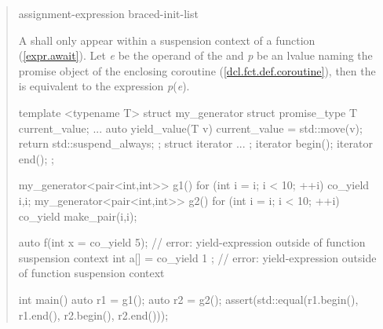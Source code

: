 \begin{quote}
\begin{bnf}
  \br
   assignment-expression\br
   braced-init-list
\end{bnf}

\pnum
A  shall only appear within a suspension context of a function (\ref{expr.await}).
  Let \textit{e} be the operand of the  and \textit{p} be an lvalue naming the promise object of the enclosing coroutine (\ref{dcl.fct.def.coroutine}), then the  is equivalent to the expression  \textit{p}(\textit{e}). 
  

\enterexample
\begin{codeblock}
template <typename T>
struct my_generator {
  struct promise_type {
    T current_value;
    ...
    auto yield_value(T v) {
      current_value = std::move(v);
      return std::suspend_always{};
    }
  };
  struct iterator { ... };
  iterator begin();
  iterator end();
};
  
my_generator<pair<int,int>> g1() {
  for (int i = i; i < 10; ++i) co_yield {i,i};
}
my_generator<pair<int,int>> g2() { 
  for (int i = i; i < 10; ++i) co_yield make_pair(i,i);
}

auto f(int x = co_yield 5); // error: yield-expression outside of function suspension context
int a[] = { co_yield 1 }; // error: yield-expression outside of function suspension context

int main() {
  auto r1 = g1();
  auto r2 = g2();
  assert(std::equal(r1.begin(), r1.end(), r2.begin(), r2.end()));
}
\end{codeblock}

\exitexample
%
%



\end{quote}

